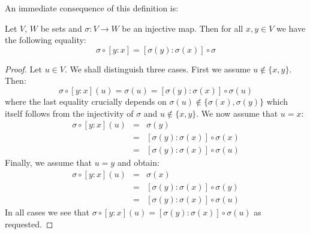 An immediate consequence of this definition is:
\begin{prop}\label{logic:prop:FUAP:singlevar:composition:injective}
Let $V$, $W$ be sets and $\sigma:V\to W$ be an injective map. Then
for all $x,y\in V$ we have the following equality:
    \[
    \sigma\circ[y\!:\!x]=[\sigma(y)\!:\!\sigma(x)]\circ\sigma
    \]
\end{prop}
\begin{proof}
Let $u\in V$. We shall distinguish three cases. First we assume
$u\not\in\{x,y\}$. Then:
    \[
    \sigma\circ[y\!:\!x](u)=\sigma(u)=[\sigma(y)\!:\!\sigma(x)]\circ\sigma(u)
    \]
where the last equality crucially depends on
$\sigma(u)\not\in\{\sigma(x),\sigma(y)\}$ which itself follows from
the injectivity of $\sigma$ and $u\not\in\{x,y\}$. We now assume
that $u=x$:
\begin{eqnarray*}
    \sigma\circ[y\!:\!x](u)&=&\sigma(y)\\
    &=&[\sigma(y)\!:\!\sigma(x)]\circ\sigma(x)\\
    &=&[\sigma(y)\!:\!\sigma(x)]\circ\sigma(u)
    \end{eqnarray*}
Finally, we assume that $u=y$ and obtain:
    \begin{eqnarray*}
    \sigma\circ[y\!:\!x](u)&=&\sigma(x)\\
    &=&[\sigma(y)\!:\!\sigma(x)]\circ\sigma(y)\\
    &=&[\sigma(y)\!:\!\sigma(x)]\circ\sigma(u)
    \end{eqnarray*}
In all cases we see that
$\sigma\circ[y\!:\!x](u)=[\sigma(y)\!:\!\sigma(x)]\circ\sigma(u)$ as
requested.
\end{proof}

